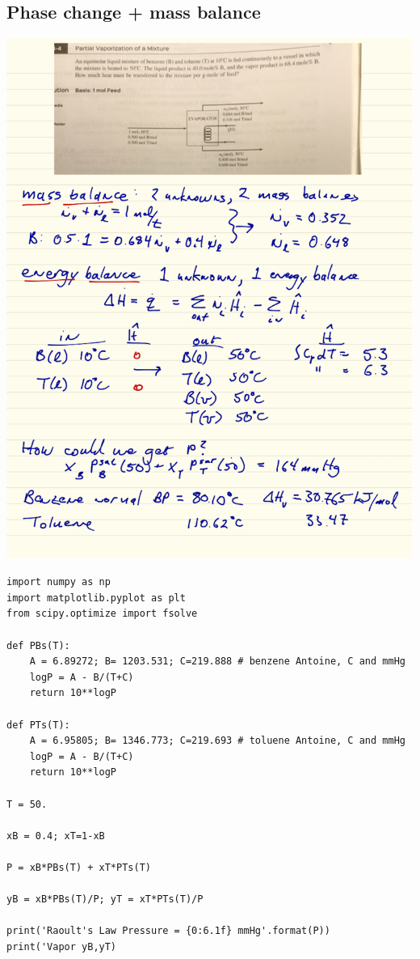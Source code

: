 \documentclass[11pt]{article}
\begin{document}
\subsection{Phase change + mass balance}
\label{sec-10-6}
\includegraphics[width=.9\linewidth]{./figs/MassEnergy1.png}

\begin{verbatim}
import numpy as np
import matplotlib.pyplot as plt
from scipy.optimize import fsolve

def PBs(T):
    A = 6.89272; B= 1203.531; C=219.888 # benzene Antoine, C and mmHg
    logP = A - B/(T+C)
    return 10**logP

def PTs(T):
    A = 6.95805; B= 1346.773; C=219.693 # toluene Antoine, C and mmHg
    logP = A - B/(T+C)
    return 10**logP

T = 50.

xB = 0.4; xT=1-xB

P = xB*PBs(T) + xT*PTs(T)

yB = xB*PBs(T)/P; yT = xT*PTs(T)/P

print('Raoult's Law Pressure = {0:6.1f} mmHg'.format(P))
print('Vapor yB,yT)
\end{verbatim}
\end{document}

